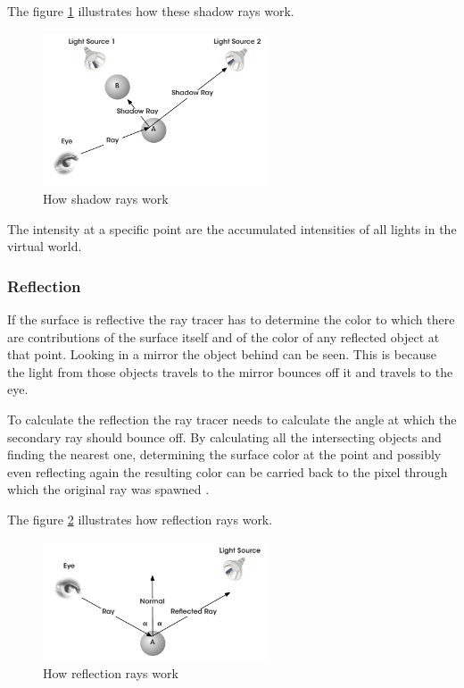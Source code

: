 \documentclass[DIV10, abstracton, openright, footsepline, headsepline, twoside, 9pt,
bigheadings]{scrreprt}
\begin{document}
The figure \ref{fig:shadow} illustrates how these shadow rays work.

\begin{figure}[H]
\centering
\includegraphics[width=0.6\textwidth]{bilder/shadow}
\caption{How shadow rays work}
\label{fig:shadow}
\end{figure}

The intensity at a specific point are the accumulated intensities of all lights
in the virtual world.

\subsubsection{Reflection}
If the surface is reflective the ray tracer has to determine the color to which
there are contributions of the surface itself and of the color of any reflected
object at that point. Looking in a mirror the object behind can be seen. This is
because the light from those objects travels to the mirror bounces off it and
travels to the eye.

To calculate the reflection the ray tracer needs to calculate the angle at
which the secondary ray should bounce off. By calculating all the
intersecting
objects and finding the nearest one,  determining the surface color at the
point and possibly even reflecting again the resulting color can be carried
back to the pixel through which the original ray was spawned \cite{Hearn94}.

The figure \ref{fig:reflection} illustrates how reflection rays work.

\begin{figure}[H]
\centering
\includegraphics[width=0.6\textwidth]{bilder/reflection}
\caption{How reflection rays work}
\label{fig:reflection}
\end{figure}
\end{document}
